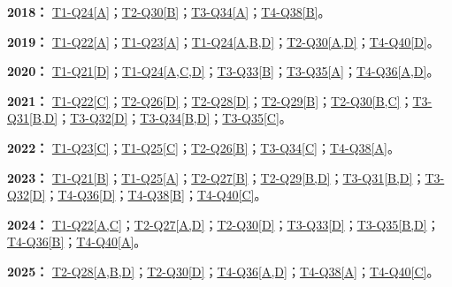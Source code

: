 \documentclass[11pt,a4paper]{article}
\begin{document}
\noindent\textbf{2018：} \hyperref[idx-2018-T1-Q24]{T1-Q24[A]}；\hyperref[idx-2018-T2-Q30]{T2-Q30[B]}；\hyperref[idx-2018-T3-Q34]{T3-Q34[A]}；\hyperref[idx-2018-T4-Q38]{T4-Q38[B]}。\par\smallskip
\noindent\textbf{2019：} \hyperref[idx-2019-T1-Q22]{T1-Q22[A]}；\hyperref[idx-2019-T1-Q23]{T1-Q23[A]}；\hyperref[idx-2019-T1-Q24]{T1-Q24[A,B,D]}；\hyperref[idx-2019-T2-Q30]{T2-Q30[A,D]}；\hyperref[idx-2019-T4-Q40]{T4-Q40[D]}。\par\smallskip
\noindent\textbf{2020：} \hyperref[idx-2020-T1-Q21]{T1-Q21[D]}；\hyperref[idx-2020-T1-Q24]{T1-Q24[A,C,D]}；\hyperref[idx-2020-T3-Q33]{T3-Q33[B]}；\hyperref[idx-2020-T3-Q35]{T3-Q35[A]}；\hyperref[idx-2020-T4-Q36]{T4-Q36[A,D]}。\par\smallskip
\noindent\textbf{2021：} \hyperref[idx-2021-T1-Q22]{T1-Q22[C]}；\hyperref[idx-2021-T2-Q26]{T2-Q26[D]}；\hyperref[idx-2021-T2-Q28]{T2-Q28[D]}；\hyperref[idx-2021-T2-Q29]{T2-Q29[B]}；\hyperref[idx-2021-T2-Q30]{T2-Q30[B,C]}；\hyperref[idx-2021-T3-Q31]{T3-Q31[B,D]}；\hyperref[idx-2021-T3-Q32]{T3-Q32[D]}；\hyperref[idx-2021-T3-Q34]{T3-Q34[B,D]}；\hyperref[idx-2021-T3-Q35]{T3-Q35[C]}。\par\smallskip
\noindent\textbf{2022：} \hyperref[idx-2022-T1-Q23]{T1-Q23[C]}；\hyperref[idx-2022-T1-Q25]{T1-Q25[C]}；\hyperref[idx-2022-T2-Q26]{T2-Q26[B]}；\hyperref[idx-2022-T3-Q34]{T3-Q34[C]}；\hyperref[idx-2022-T4-Q38]{T4-Q38[A]}。\par\smallskip
\noindent\textbf{2023：} \hyperref[idx-2023-T1-Q21]{T1-Q21[B]}；\hyperref[idx-2023-T1-Q25]{T1-Q25[A]}；\hyperref[idx-2023-T2-Q27]{T2-Q27[B]}；\hyperref[idx-2023-T2-Q29]{T2-Q29[B,D]}；\hyperref[idx-2023-T3-Q31]{T3-Q31[B,D]}；\hyperref[idx-2023-T3-Q32]{T3-Q32[D]}；\hyperref[idx-2023-T4-Q36]{T4-Q36[D]}；\hyperref[idx-2023-T4-Q38]{T4-Q38[B]}；\hyperref[idx-2023-T4-Q40]{T4-Q40[C]}。\par\smallskip
\noindent\textbf{2024：} \hyperref[idx-2024-T1-Q22]{T1-Q22[A,C]}；\hyperref[idx-2024-T2-Q27]{T2-Q27[A,D]}；\hyperref[idx-2024-T2-Q30]{T2-Q30[D]}；\hyperref[idx-2024-T3-Q33]{T3-Q33[D]}；\hyperref[idx-2024-T3-Q35]{T3-Q35[B,D]}；\hyperref[idx-2024-T4-Q36]{T4-Q36[B]}；\hyperref[idx-2024-T4-Q40]{T4-Q40[A]}。\par\smallskip
\noindent\textbf{2025：} \hyperref[idx-2025-T2-Q28]{T2-Q28[A,B,D]}；\hyperref[idx-2025-T2-Q30]{T2-Q30[D]}；\hyperref[idx-2025-T4-Q36]{T4-Q36[A,D]}；\hyperref[idx-2025-T4-Q38]{T4-Q38[A]}；\hyperref[idx-2025-T4-Q40]{T4-Q40[C]}。\par\smallskip
{}
\end{document}
